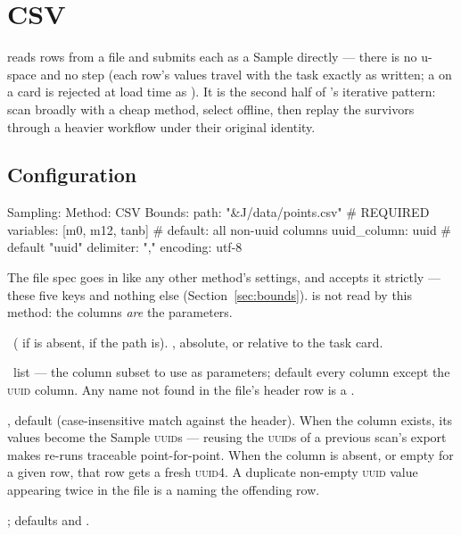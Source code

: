 \chapter{CSV}
\label{ch:csv-sampler}

  reads rows from a
file and submits each as a Sample directly --- there is no u-space and no
 step (each row's values travel with the task exactly as written; a
 on a  card is rejected at load time as
). It is the second half of
\Jtwo's iterative pattern: scan broadly with a cheap method, select offline, then
replay the survivors through a heavier workflow under their original identity.

\section{Configuration}
\label{sec:csv-config}

\begin{yamlwin}
Sampling:
  Method: CSV
  Bounds:
    path: "&J/data/points.csv"   # REQUIRED
    variables: [m0, m12, tanb]   # default: all non-uuid columns
    uuid_column: uuid            # default "uuid"
    delimiter: ","
    encoding: utf-8
\end{yamlwin}

The file spec goes in  like any other method's settings, and
 accepts it strictly --- these five keys and nothing else
(Section~\ref{sec:bounds}).  is not read by this method: the
columns \emph{are} the parameters.

\begin{keylist}
  \item[Bounds.path] \req\ ( if  is absent,
         if the path is). , absolute, or relative
        to the task card.
  \item[variables] \opt\ list --- the column subset to use as parameters; default every
        column except the \textsc{uuid} column. Any name not found in the file's header
        row is a .
  \item[uuid\_column] \opt, default  (case-insensitive match against the
        header). When the column exists, its values become the Sample \textsc{uuid}s
        --- reusing the \textsc{uuid}s of a previous scan's export makes re-runs
        traceable point-for-point. When the column is absent, or empty for a given row,
        that row gets a fresh \textsc{uuid4}. A duplicate non-empty \textsc{uuid} value
        appearing twice in the file is a  naming the offending row.
  \item[delimiter, encoding] \opt; defaults  and .
\end{keylist}

